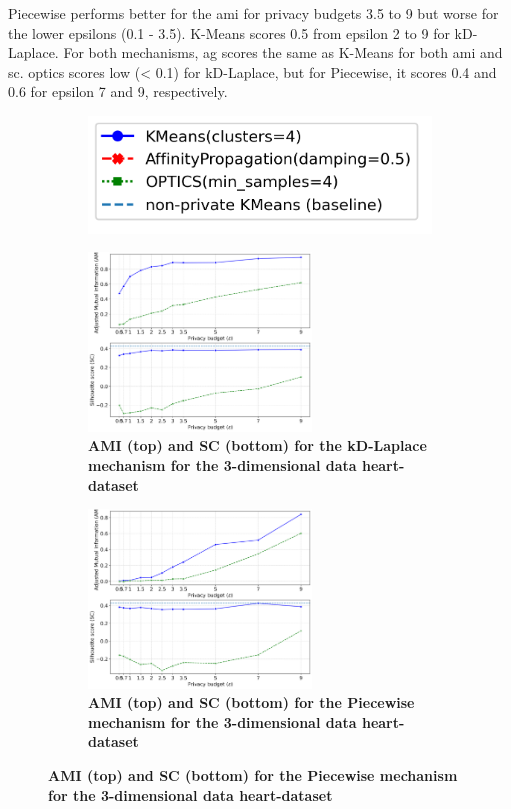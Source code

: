 Piecewise performs better for the \gls{ami} for privacy budgets 3.5 to 9 but worse for the lower epsilons (0.1 - 3.5).
K-Means scores 0.5 from epsilon 2 to 9 for kD-Laplace.
For both mechanisms, \gls{ag} scores the same as K-Means for both \gls{ami} and \gls{sc}.
\gls{optics} scores low (< 0.1) for kD-Laplace, but for Piecewise, it scores 0.4 and 0.6 for epsilon 7 and 9, respectively.
\newpage
\begin{figure}[H]
    \centering
    \begin{subfigure}{0.3\textwidth}
        \includegraphics[width=\textwidth]{Results/2d-laplace/heart-dataset/legend.png}
    \end{subfigure}
    \begin{subfigure}{1\textwidth}
        \caption{\textbf{AMI (top) and SC (bottom) for the kD-Laplace mechanism for the 3-dimensional data heart-dataset}}
        \centering
        \includegraphics[width=0.65\textwidth]{Results/kd-laplace/kd-Laplace/heart-dataset/ami-and-sc_3_dimensions.png}
        \centering
    \end{subfigure}
    \begin{subfigure}{1\textwidth}
        \caption{\textbf{AMI (top) and SC (bottom) for the Piecewise mechanism for the 3-dimensional data heart-dataset}}
        \centering
        \includegraphics[width=0.65\textwidth]{Results/kd-laplace/piecewise/heart-dataset/ami-and-sc_3_dimensions.png}

\end{subfigure}
\end{figure}
